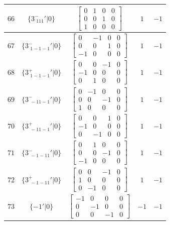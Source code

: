 \documentclass[fleqn,8pt]{jsarticle}
\begin{document}
\begin{longtable}{ccccc}
$ 66 $ & $ \{3^{-}_{\,\,111}{}'|0\} $ & $ \begin{bmatrix} 0 & 1 & 0 & 0 \\ 0 & 0 & 1 & 0 \\ 1 & 0 & 0 & 0 \end{bmatrix} $ & $ 1 $ & $ -1 $ \\ \hline
$ 67 $ & $ \{3^{-}_{\,\,1-1-1}{}'|0\} $ & $ \begin{bmatrix} 0 & -1 & 0 & 0 \\ 0 & 0 & 1 & 0 \\ -1 & 0 & 0 & 0 \end{bmatrix} $ & $ 1 $ & $ -1 $ \\ \hline
$ 68 $ & $ \{3^{+}_{\,\,1-1-1}{}'|0\} $ & $ \begin{bmatrix} 0 & 0 & -1 & 0 \\ -1 & 0 & 0 & 0 \\ 0 & 1 & 0 & 0 \end{bmatrix} $ & $ 1 $ & $ -1 $ \\ \hline
$ 69 $ & $ \{3^{-}_{\,\,-11-1}{}'|0\} $ & $ \begin{bmatrix} 0 & -1 & 0 & 0 \\ 0 & 0 & -1 & 0 \\ 1 & 0 & 0 & 0 \end{bmatrix} $ & $ 1 $ & $ -1 $ \\ \hline
$ 70 $ & $ \{3^{+}_{\,\,-11-1}{}'|0\} $ & $ \begin{bmatrix} 0 & 0 & 1 & 0 \\ -1 & 0 & 0 & 0 \\ 0 & -1 & 0 & 0 \end{bmatrix} $ & $ 1 $ & $ -1 $ \\ \hline
$ 71 $ & $ \{3^{-}_{\,\,-1-11}{}'|0\} $ & $ \begin{bmatrix} 0 & 1 & 0 & 0 \\ 0 & 0 & -1 & 0 \\ -1 & 0 & 0 & 0 \end{bmatrix} $ & $ 1 $ & $ -1 $ \\ \hline
$ 72 $ & $ \{3^{+}_{\,\,-1-11}{}'|0\} $ & $ \begin{bmatrix} 0 & 0 & -1 & 0 \\ 1 & 0 & 0 & 0 \\ 0 & -1 & 0 & 0 \end{bmatrix} $ & $ 1 $ & $ -1 $ \\ \hline
$ 73 $ & $ \{-1{}'|0\} $ & $ \begin{bmatrix} -1 & 0 & 0 & 0 \\ 0 & -1 & 0 & 0 \\ 0 & 0 & -1 & 0 \end{bmatrix} $ & $ -1 $ & $ -1 $ \\ \hline

\end{longtable}
\end{document}
